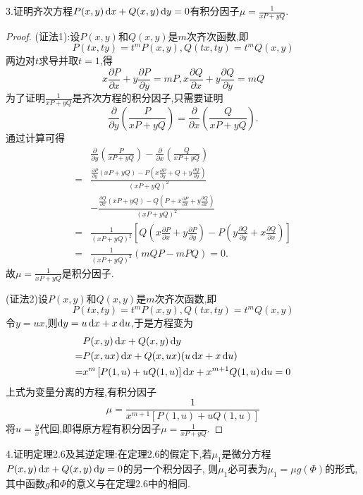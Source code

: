 3.证明齐次方程$P(x,y)\mathop{}\!\mathrm{d} x+Q(x,y)\mathop{}\!\mathrm{d} y=0$有积分因子$\mu=\frac{1}{xP+yQ}$.

\begin{proof}
(证法1):设$P(x,y)$和$Q(x,y)$是$m$次齐次函数,即
\[P(tx,ty)=t^mP(x,y),Q(tx,ty)=t^mQ(x,y)\]
两边对$t$求导并取$t=1$,得
\[x\frac{\partial P}{\partial x}+y\frac{\partial P}{\partial y}=mP,x\frac{\partial Q}{\partial x}+y\frac{\partial Q}{\partial y}=mQ\]
为了证明$\frac{1}{xP+yQ}$是齐次方程的积分因子,只需要证明
\[\frac{\partial}{\partial y}\left(\frac{P}{xP+yQ}\right)=\frac{\partial}{\partial x}\left(\frac{Q}{xP+yQ}\right).\]
通过计算可得
\[\begin{split}
&\frac{\partial}{\partial y}\left(\frac{P}{xP+yQ}\right)-\frac{\partial}{\partial x}\left(\frac{Q}{xP+yQ}\right)\\
=&\frac{\frac{\partial P}{\partial y}(xP+yQ)-P\left(x\frac{\partial P}{\partial y}+Q+y\frac{\partial Q}{\partial y}\right)}{(xP+yQ)^2}\\
&-\frac{\frac{\partial Q}{\partial x}(xP+yQ)-Q\left(P+x\frac{\partial P}{\partial x}+y\frac{\partial Q}{\partial x}\right)}{(xP+yQ)^2}\\
=&\frac{1}{(xP+yQ)^2}\left[Q\left(x\frac{\partial P}{\partial x}+y\frac{\partial P}{\partial y}\right)-P\left(y\frac{\partial Q}{\partial y}+x\frac{\partial Q}{\partial x}\right)\right]\\
=&\frac{1}{(xP+yQ)^2}(mQP-mPQ)=0.
\end{split}\]
故$\mu=\frac{1}{xP+yQ}$是积分因子.

(证法2)设$P(x,y)$和$Q(x,y)$是$m$次齐次函数,即
\[P(tx,ty)=t^mP(x,y),Q(tx,ty)=t^mQ(x,y)\]
令$y=ux$,则$\mathop{}\!\mathrm{d} y=u\mathop{}\!\mathrm{d} x+x\mathop{}\!\mathrm{d} u$,于是方程变为
\[\begin{split}
&P(x,y)\mathop{}\!\mathrm{d} x+Q(x,y)\mathop{}\!\mathrm{d} y\\
=&P(x,ux)\mathop{}\!\mathrm{d} x+Q(x,ux)(u\mathop{}\!\mathrm{d} x+x\mathop{}\!\mathrm{d} u)\\
=&x^m\left[P(1,u)+uQ(1,u)\right]\mathop{}\!\mathrm{d} x+x^{m+1}Q(1,u)\mathop{}\!\mathrm{d} u=0
\end{split}\]
上式为变量分离的方程,有积分因子
\[\mu=\frac{1}{x^{m+1}[P(1,u)+uQ(1,u)]}\]
将$u=\frac{y}{x}$代回,即得原方程有积分因子$\mu=\frac{1}{xP+yQ}$.
\end{proof}


4.证明定理2.6及其逆定理:在定理2.6的假定下,若$\mu_1$是微分方程$P(x,y)\mathop{}\!\mathrm{d} x+Q(x,y)\mathop{}\!\mathrm{d} y=0$的另一个积分因子,
则$\mu_1$必可表为$\mu_1=\mu g(\varPhi)$的形式,其中函数$g$和$\varPhi$的意义与在定理2.6中的相同.

